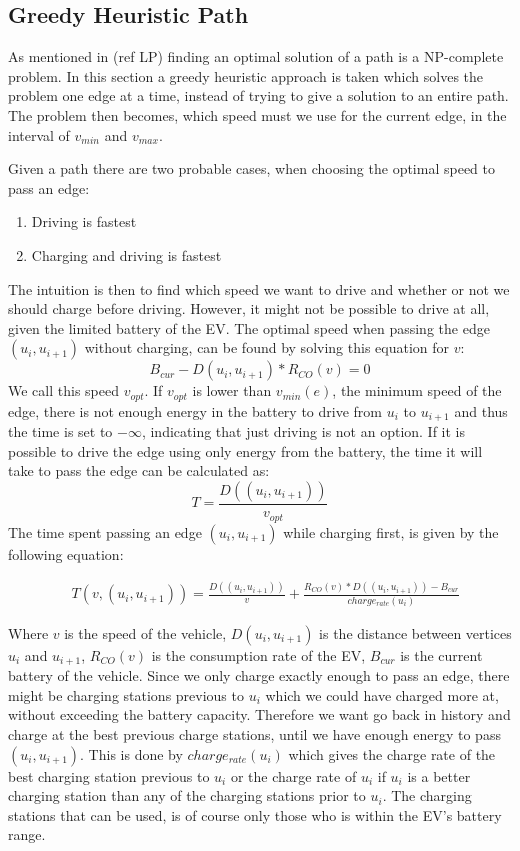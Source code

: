 \subsection{Greedy Heuristic Path}\label{sec:greedy}
As mentioned in (ref LP) finding an optimal solution of a path is a NP-complete problem. In this section a greedy heuristic approach is taken which solves the problem one edge at a time, instead of trying to give a solution to an entire path. The problem then becomes, which speed must we use for the current edge, in the interval of $v_{min}$ and $v_{max}$.

Given a path there are two probable cases, when choosing the optimal speed to pass an edge:
\begin{enumerate}
	\item Driving is fastest
	\item Charging and driving is fastest
\end{enumerate}

The intuition is then to find which speed we want to drive and whether or not we should charge before driving. However, it might not be possible to drive at all, given the limited battery of the EV. The optimal speed when passing the edge $(u_i, u_{i+1})$ without charging, can be found by solving this equation for $v$:
\[B_{cur} - D(u_i, u_{i+1}) * R_{CO}(v) = 0\] 
We call this speed $v_{opt}$. If $v_{opt}$ is lower than $v_{min}(e)$, the minimum speed of the edge, there is not enough energy in the battery to drive from $u_i$ to $u_{i+1}$ and thus the time is set to $-\infty$, indicating that just driving is not an option. If it is possible to drive the edge using only energy from the battery, the time it will take to pass the edge can be calculated as:
 \[T = \frac{D((u_i, u_{i+1}))}{v_{opt}} \] 
The time spent passing an edge $(u_i, u_{i+1})$ while charging first, is given by the following equation:

\begin{equation*}
\begin{aligned}
 & T(v,(u_i, u_{i+1})) = \frac{D((u_i, u_{i+1}))}{v} + \frac{R_{CO}(v) * D((u_i, u_{i+1})) - B_{cur}}{charge_{rate}(u_{i})}
\end{aligned}
\end{equation*}\label{eq:drivingAndCharging}

Where $v$ is the speed of the vehicle, $D(u_i, u_{i+1})$ is the distance between vertices $u_i$ and $u_{i+1}$, $R_{CO}(v)$ is the consumption rate of the EV, $B_{cur}$ is the current battery of the vehicle. Since we only charge exactly enough to pass an edge, there might be charging stations previous to $u_i$ which we could have charged more at, without exceeding the battery capacity. Therefore we want go back in history and charge at the best previous charge stations, until we have enough energy to pass $(u_i, u_{i+1})$. This is done by $charge_{rate}(u_i)$ which gives the charge rate of the best charging station previous to $u_{i}$ or the charge rate of $u_i$ if $u_i$ is a better charging station than any of the charging stations prior to $u_i$. The charging stations that can be used, is of course only those who is within the EV's battery range.

